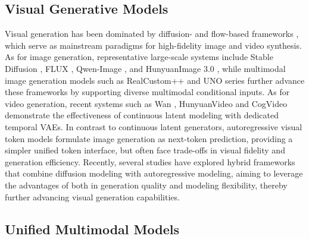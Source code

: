 \documentclass{llmxive}
\begin{document}
\subsection{Visual Generative Models}
Visual generation has been dominated by diffusion- and flow-based frameworks \cite{ho2020denoising,esser2024scaling,lipman2024flow,wu2024vmix,huang2024realcustom, mao2024realcustom++,fu2025feededit,fu2026layeredit,mou2025dreamo,blackforestlabs_flux,labs2025flux}, which serve as mainstream paradigms for high-fidelity image and video synthesis.
As for image generation, representative large-scale systems include Stable Diffusion \cite{rombach2022high,podell2024sdxl,wu2024taiyidiffusionxl,esser2024scaling}, FLUX \cite{blackforestlabs_flux,labs2025flux}, Qwen-Image \cite{wu2025qwen}, and HunyuanImage 3.0 \cite{cao2025hunyuanimage}, while multimodal image generation models such as RealCustom++ \cite{huang2024realcustom, mao2025realcustom++} and UNO series \cite{wu2025less,cheng2025umo,wu2025uso} further advance these frameworks by supporting diverse multimodal conditional inputs. As for video generation, recent systems such as Wan \cite{wan2025wan}, HunyuanVideo \cite{wu2025hunyuanvideo} and CogVideo \cite{hong2022cogvideo,yang2024cogvideox} demonstrate the effectiveness of continuous latent modeling with dedicated temporal VAEs.
In contrast to continuous latent generators, autoregressive visual token models \cite{ramesh2021zero,chang2022maskgit,esser2021taming,peebles2023scalable,kondratyuk2023videopoet,tian2024visual,huang2023towards,mao2026toward} formulate image generation as next-token prediction, providing a simpler unified token interface, but often face trade-offs in visual fidelity and generation efficiency.
Recently, several studies \cite{liu2024mardini,li2024autoregressive,fan2025unified} have explored hybrid frameworks that combine diffusion modeling with autoregressive modeling, aiming to leverage the advantages of both in generation quality and modeling flexibility, thereby further advancing visual generation capabilities.

\subsection{Unified Multimodal Models}
\end{document}
